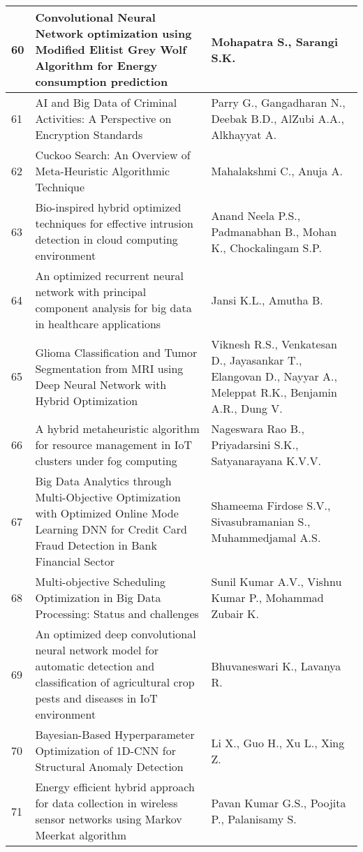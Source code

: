 \begin{landscape}
\begin{longtable}{|p{0.5cm}|p{9cm}|p{7cm}|}
    \hline
    60 & Convolutional Neural Network optimization using Modified Elitist Grey Wolf Algorithm for Energy consumption prediction & Mohapatra S., Sarangi S.K. \\
    \hline
    61 & AI and Big Data of Criminal Activities: A Perspective on Encryption Standards & Parry G., Gangadharan N., Deebak B.D., AlZubi A.A., Alkhayyat A. \\
    \hline
    62 & Cuckoo Search: An Overview of Meta-Heuristic Algorithmic Technique & Mahalakshmi C., Anuja A. \\
    \hline
    63 & Bio-inspired hybrid optimized techniques for effective intrusion detection in cloud computing environment & Anand Neela P.S., Padmanabhan B., Mohan K., Chockalingam S.P. \\
    \hline
    64 & An optimized recurrent neural network with principal component analysis for big data in healthcare applications & Jansi K.L., Amutha B. \\
    \hline
    65 & Glioma Classification and Tumor Segmentation from MRI using Deep Neural Network with Hybrid Optimization & Viknesh R.S., Venkatesan D., Jayasankar T., Elangovan D., Nayyar A., Meleppat R.K., Benjamin A.R., Dung V. \\
    \hline
    66 & A hybrid metaheuristic algorithm for resource management in IoT clusters under fog computing & Nageswara Rao B., Priyadarsini S.K., Satyanarayana K.V.V. \\
    \hline
    67 & Big Data Analytics through Multi-Objective Optimization with Optimized Online Mode Learning DNN for Credit Card Fraud Detection in Bank Financial Sector & Shameema Firdose S.V., Sivasubramanian S., Muhammedjamal A.S. \\
    \hline
    68 & Multi-objective Scheduling Optimization in Big Data Processing: Status and challenges & Sunil Kumar A.V., Vishnu Kumar P., Mohammad Zubair K. \\
    \hline
    69 & An optimized deep convolutional neural network model for automatic detection and classification of agricultural crop pests and diseases in IoT environment & Bhuvaneswari K., Lavanya R. \\
    \hline
    70 & Bayesian-Based Hyperparameter Optimization of 1D-CNN for Structural Anomaly Detection & Li X., Guo H., Xu L., Xing Z. \\
    \hline
    71 & Energy efficient hybrid approach for data collection in wireless sensor networks using Markov Meerkat algorithm & Pavan Kumar G.S., Poojita P., Palanisamy S. \\

\end{longtable}
\end{landscape}
